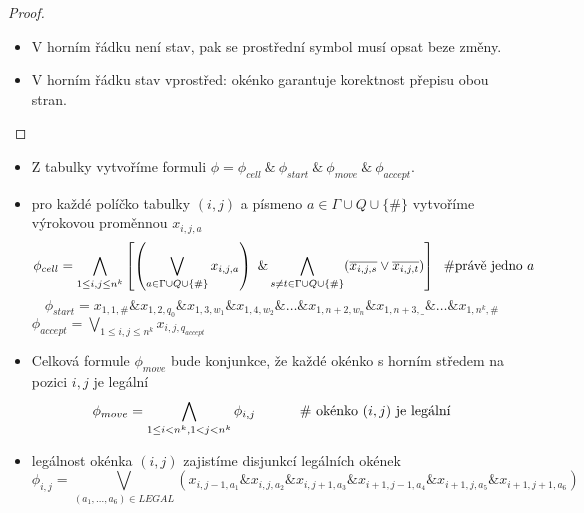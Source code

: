 \begin{frame}{}
\begin{proof}{}
\begin{itemize}
\begin{itemize}[<+->]
        \begin{itemize}
            \item V horním řádku není stav, pak se prostřední symbol musí opsat beze změny.
            \item V horním řádku stav vprostřed: okénko garantuje korektnost přepisu obou stran.
        \end{itemize}
    \end{itemize}
        
        
    \end{itemize}
    \end{proof}
    \end{frame}
    
    
    \begin{frame}{}
    \begin{proofe}
    \begin{itemize}[<+->]
        \item Z tabulky vytvoříme formuli $\phi=\phi_{cell}\ \&\ \phi_{start}\ \&\ \phi_{move}\ \&\  \phi_{accept}$.
        \item pro každé políčko tabulky $(i,j) $ a písmeno $a\in \Gamma\cup Q \cup \{\#\}$ vytvoříme výrokovou proměnnou $x_{i,j,a}$
        $$
        \phi_{cell}=\bigwedge_{1\leq i,j \leq n^k} \left[ \left(\bigvee_{a \in \Gamma\cup Q \cup \{\#\}} x_{i,j,a}\right) \ 
        \&\bigwedge_{s\neq t\in \Gamma\cup Q \cup \{\#\}} (\overline{x_{i,j,s}}\vee \overline{x_{i,j,t}})\right]\hbox{\hspace{0.1cm}   \#právě jedno $a$}
        $$
     \pause
        $$\phi_{start}= x_{1,1,\#}\& x_{1,2,q_0} \& x_{1,3,w_1}\& x_{1,4,w_2}\& \ldots \& x_{1,n+2,w_n}\& x_{1,n+3,\_}\&\ldots \& x_{1,n^k,\#}
        $$
     \pause
    $\phi_{accept}= \bigvee_{1\leq i,j \leq n^k} x_{i,j,q_{accept}}
    $
        \item Celková formule $\phi_{move}$ bude konjunkce, že každé okénko s horním středem na pozici $i,j$ je legální
    $$\phi_{move}=\bigwedge_{1\leq i < n^k, 1<j<n^k} \phi_{i,j}\hbox{\hspace{1cm}   \# okénko $(i,j)$ je legální}
    $$
    \item  legálnost okénka $(i,j)$ zajistíme disjunkcí legálních okének
    $$\phi_{i,j}=\bigvee_{(a_1,\ldots,a_6) \in LEGAL} (x_{i,j-1,a_1}\& x_{i,j,a_2}\& x_{i,j+1,a_3}\& 
    x_{i+1,j-1,a_4}\& x_{i+1,j,a_5}\& x_{i+1,j+1,a_6} )
    $$
    \end{itemize}
    \end{proofe}
    \end{frame}
    
